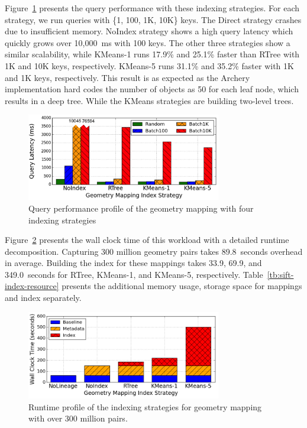 \documentclass{sig-alternate}
\begin{document}
Figure~\ref{fig:sift-query} presents the query performance with these indexing strategies.
For each strategy, we run queries with \{1, 100, 1K, 10K\} keys.
The Direct strategy crashes due to insufficient memory.
NoIndex strategy shows a high query latency which quickly grows over 10,000~ms with 100 keys.
The other three strategies show a similar scalability, while KMeans-1 runs 17.9\% and 25.1\% faster than RTree with 1K and 10K keys, respectively.
KMeans-5 runs  31.1\% and 35.2\% faster with 1K and 1K keys, respectively.
This result is as expected as the Archery implementation hard codes the number of objects as 50 for each leaf node, which results in a deep tree.
While the KMeans strategies are building two-level trees.

\begin{figure}[t]
\begin{center}
    \includegraphics[width=85mm]{pictures/SIFTQuery-Time-tuned}
\caption {Query performance profile of the geometry mapping with four indexing strategies
    \label{fig:sift-query}
}
\end{center}
\end{figure}

Figure~\ref{fig:sift-time} presents the wall clock time of this workload with a detailed runtime decomposition. 
Capturing 300 million geometry pairs takes 89.8~seconds overhead in average. 
Building the index for these mappings takes 33.9, 69.9, and 349.0~seconds for RTree, KMeans-1, and KMeans-5, respectively.
Table~\ref{tb:sift-index-resource} presents the additional memory usage, storage space for mappings and
index separately.

\begin{figure}[t]
\begin{center}
    \includegraphics[width=85mm]{pictures/SIFTIndex-Time}
\caption {Runtime profile of the indexing strategies for geometry mapping with over 300 million pairs.
    \label{fig:sift-time}
}
\end{center}
\end{figure}
\end{document}
